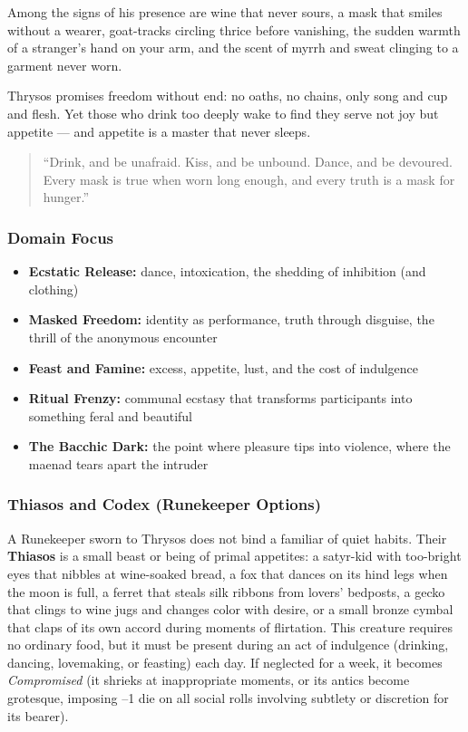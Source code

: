 Among the signs of his presence are wine that never sours, a mask that smiles without a wearer, goat-tracks circling thrice before vanishing, the sudden warmth of a stranger's hand on your arm, and the scent of myrrh and sweat clinging to a garment never worn.

Thrysos promises freedom without end: no oaths, no chains, only song and cup and flesh. Yet those who drink too deeply wake to find they serve not joy but appetite --- and appetite is a master that never sleeps.

\begin{quote}
``Drink, and be unafraid. Kiss, and be unbound. Dance, and be devoured. Every mask is true when worn long enough, and every truth is a mask for hunger.''
\end{quote}

\subsubsection*{Domain Focus}
\begin{itemize}
  \item \textbf{Ecstatic Release:} dance, intoxication, the shedding of inhibition (and clothing)
  \item \textbf{Masked Freedom:} identity as performance, truth through disguise, the thrill of the anonymous encounter
  \item \textbf{Feast and Famine:} excess, appetite, lust, and the cost of indulgence
  \item \textbf{Ritual Frenzy:} communal ecstasy that transforms participants into something feral and beautiful
  \item \textbf{The Bacchic Dark:} the point where pleasure tips into violence, where the maenad tears apart the intruder
\end{itemize}

\subsubsection*{Thiasos and Codex (Runekeeper Options)}

A Runekeeper sworn to Thrysos does not bind a familiar of quiet habits. Their \textbf{Thiasos} is a small beast or being of primal appetites: a satyr-kid with too-bright eyes that nibbles at wine-soaked bread, a fox that dances on its hind legs when the moon is full, a ferret that steals silk ribbons from lovers' bedposts, a gecko that clings to wine jugs and changes color with desire, or a small bronze cymbal that claps of its own accord during moments of flirtation. This creature requires no ordinary food, but it must be present during an act of indulgence (drinking, dancing, lovemaking, or feasting) each day. If neglected for a week, it becomes \textit{Compromised} (it shrieks at inappropriate moments, or its antics become grotesque, imposing --1 die on all social rolls involving subtlety or discretion for its bearer).


